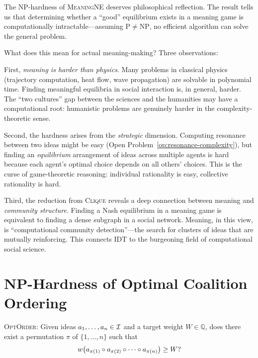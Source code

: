 \begin{remark}
The NP-hardness of \textsc{MeaningNE} deserves philosophical
reflection.  The result tells us that determining whether a
``good'' equilibrium exists in a meaning game is computationally
intractable---assuming $\mathrm{P} \neq \mathrm{NP}$, no efficient
algorithm can solve the general problem.

What does this mean for actual meaning-making?  Three observations:

First, \emph{meaning is harder than physics}.  Many problems in
classical physics (trajectory computation, heat flow, wave propagation)
are solvable in polynomial time.  Finding meaningful equilibria in
social interaction is, in general, harder.  The ``two cultures'' gap
between the sciences and the humanities may have a computational root:
humanistic problems are genuinely harder in the complexity-theoretic
sense.

Second, the hardness arises from the \emph{strategic} dimension.
Computing resonance between two ideas might be easy (Open
Problem~\ref{op:resonance-complexity}), but finding an \emph{equilibrium}
arrangement of ideas across multiple agents is hard because each agent's
optimal choice depends on all others' choices.  This is the curse of
game-theoretic reasoning: individual rationality is easy, collective
rationality is hard.

Third, the reduction from \textsc{Clique} reveals a deep connection
between meaning and \emph{community structure}.  Finding a Nash
equilibrium in a meaning game is equivalent to finding a dense
subgraph in a social network.  Meaning, in this view, is
``computational community detection''---the search for clusters of
ideas that are mutually reinforcing.  This connects IDT to the
burgeoning field of computational social science.
\end{remark}

\section{NP-Hardness of Optimal Coalition Ordering}
\label{sec:ordering-hardness}

\begin{definition}
\label{def:optimal-ordering}
\textsc{OptOrder}: Given ideas $a_1,\ldots,a_n \in \mathcal{I}$ and a
target weight $W \in \mathbb{Q}$, does there exist a permutation
$\pi$ of $\{1,\ldots,n\}$ such that
\[
  w\bigl(a_{\pi(1)} \circ a_{\pi(2)} \circ \cdots \circ
  a_{\pi(n)}\bigr) \ge W?
\]
\end{definition}

